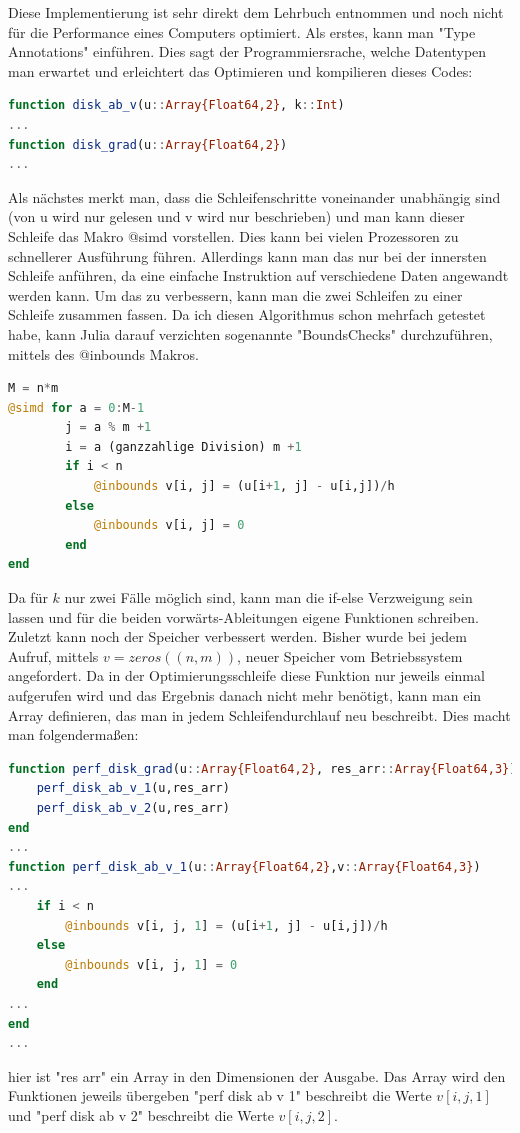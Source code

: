 \documentclass{article}
\theoremstyle{case}
\begin{document}
Diese Implementierung ist sehr direkt dem Lehrbuch entnommen und noch nicht für die Performance eines Computers optimiert. Als erstes, kann man "Type Annotations" einführen. Dies sagt der Programmiersrache, welche Datentypen man erwartet und erleichtert das Optimieren und kompilieren dieses Codes:
\begin{lstlisting}[language=Julia]
function disk_ab_v(u::Array{Float64,2}, k::Int)
...
function disk_grad(u::Array{Float64,2})
...
\end{lstlisting}
Als nächstes merkt man, dass die Schleifenschritte voneinander unabhängig sind (von u wird nur gelesen und v wird nur beschrieben) und man kann dieser Schleife das Makro @simd vorstellen. Dies kann bei vielen Prozessoren zu schnellerer Ausführung führen. Allerdings kann man das nur bei der innersten Schleife anführen, da eine einfache Instruktion auf verschiedene Daten angewandt werden kann. Um das zu verbessern, kann man die zwei Schleifen zu einer Schleife zusammen fassen. Da ich diesen Algorithmus schon mehrfach getestet habe, kann Julia darauf verzichten sogenannte "BoundsChecks" durchzuführen, mittels des @inbounds Makros.
\begin{lstlisting}[language=Julia]
M = n*m
@simd for a = 0:M-1
		j = a % m +1
		i = a (ganzzahlige Division) m +1
		if i < n
			@inbounds v[i, j] = (u[i+1, j] - u[i,j])/h
		else
			@inbounds v[i, j] = 0
		end
end
\end{lstlisting}
Da für $k$ nur zwei Fälle möglich sind, kann man die if-else Verzweigung sein lassen und für die beiden vorwärts-Ableitungen eigene Funktionen schreiben.
Zuletzt kann noch der Speicher verbessert werden. Bisher wurde bei jedem Aufruf, mittels $v=zeros((n,m))$, neuer Speicher vom Betriebssystem angefordert. Da in der Optimierungsschleife diese Funktion nur jeweils einmal aufgerufen wird und das Ergebnis danach nicht mehr benötigt, kann man ein Array definieren, das man in jedem Schleifendurchlauf neu beschreibt. Dies macht man folgendermaßen:
\begin{lstlisting}[language=Julia]
function perf_disk_grad(u::Array{Float64,2}, res_arr::Array{Float64,3})
	perf_disk_ab_v_1(u,res_arr)
	perf_disk_ab_v_2(u,res_arr)
end
...
function perf_disk_ab_v_1(u::Array{Float64,2},v::Array{Float64,3})
...
	if i < n
		@inbounds v[i, j, 1] = (u[i+1, j] - u[i,j])/h
	else
		@inbounds v[i, j, 1] = 0
	end
...
end
...
\end{lstlisting}
hier ist "res arr" ein Array in den Dimensionen der Ausgabe. Das Array wird den Funktionen jeweils übergeben "perf disk ab v 1" beschreibt die Werte $v[i,j,1]$ und "perf disk ab v 2" beschreibt die Werte $v[i,j,2]$.
\end{document}
